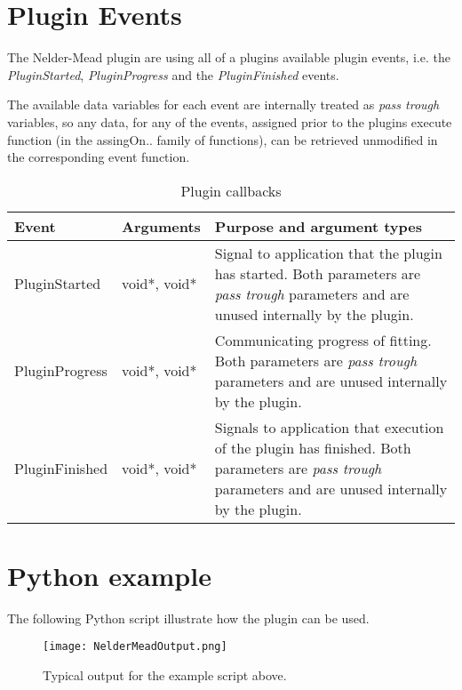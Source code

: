 \section{Plugin Events}
The Nelder-Mead plugin are using all of a plugins available plugin events, i.e. the \emph{PluginStarted}, \emph{PluginProgress} and the \emph{PluginFinished} events.

The available data variables for each event are internally treated as \emph{pass trough} variables, so any data, for any of the events, assigned prior to 
the plugins execute function (in the assingOn.. family of functions), can be retrieved unmodified in the corresponding event function.

\begin{table}[ht]
\centering %
\begin{tabular}{l l p{9cm}} 

Event & Arguments & Purpose and argument types \\ [0.5ex] %
\hline %
PluginStarted  	& 	void*, void*  & Signal to application that the plugin has started. Both parameters are \emph{pass trough} parameters and are unused internally by the plugin.\\[0.5ex]
PluginProgress	& 	void*, void*  & Communicating progress of fitting. Both parameters are \emph{pass trough} parameters and are unused internally by the plugin. \\[0.5ex]
PluginFinished	& 	void*, void*  & Signals to application that execution of the plugin has finished. Both parameters are \emph{pass trough} parameters and are unused internally by the plugin.\\

\hline %
\end{tabular}
\caption{Plugin callbacks} 
\label{table:lmfitPluginCallBacks} 
\end{table}

\section{Python example}
The following Python script illustrate how the plugin can be used. 

\begin{singlespace}

\end{singlespace}

\begin{sidewaysfigure}
\centering
\texttt{[image: NelderMeadOutput.png]}
\caption{Typical output for the example script above.}
\label{fig:nmFig}
\end{sidewaysfigure}






